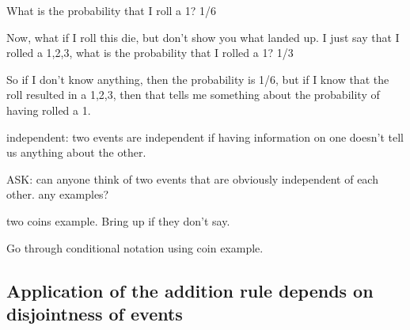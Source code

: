 \documentclass[slidestop,compress,mathserif,12pt,t,professionalfonts,xcolor=table]{beamer}
\begin{document}
\begin{frame}
{\begin{outline}
\1 What is the probability that I roll a 1? 1/6

\1 Now, what if I roll this die, but don't show you what landed up.  I just say
that I rolled a 1,2,3, what is the probability that I rolled a 1? 1/3

\1 So if I don't know anything, then the probability is 1/6, but if I know that
the roll resulted in a 1,2,3, then that tells me something about the probability
of having rolled a 1.

\1 independent: two events are independent if having information on one doesn't
tell us anything about the other.

\2 ASK: can anyone think of two events that are obviously independent of each
other.  any examples?

\3 two coins example.  Bring up if they don't say.

\3 Go through conditional notation using coin example.

\end{outline}

}

\end{frame}


\subsection{Application of the addition rule depends on disjointness of events}
\label{mi2}

\end{document}
